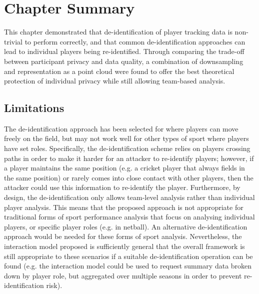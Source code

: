 

\section{Chapter Summary}

This chapter demonstrated that de-identification of player tracking data is non-trivial to perform correctly, and that common de-identification approaches can lead to individual players being re-identified. Through comparing the trade-off between participant privacy and data quality, a combination of downsampling and representation as a point cloud were found to offer the best theoretical protection of individual privacy while still allowing team-based analysis.

\subsection*{Limitations}

% 

The de-identification approach has been selected for \afl{} where players can move freely on the field, but may not work well for other types of sport where players have set roles. Specifically, the de-identification scheme relies on players crossing paths in order to make it harder for an attacker to re-identify players; however, if a player maintains the same position (e.g. a cricket player that always fields in the same position) or rarely comes into close contact with other players, then the attacker could use this information to re-identify the player. Furthermore, by design, the de-identification only allows team-level analysis rather than individual player analysis. This means that the proposed approach is not appropriate for traditional forms of sport performance analysis that focus on analysing individual players, or specific player roles (e.g. in netball). An alternative de-identification approach would be needed for these forms of sport analysis. Nevertheless, the interaction model proposed is sufficiently general that the overall framework is still appropriate to these scenarios if a suitable de-identification operation can be found (e.g. the interaction model could be used to request summary data broken down by player role, but aggregated over multiple seasons in order to prevent re-identification risk).

